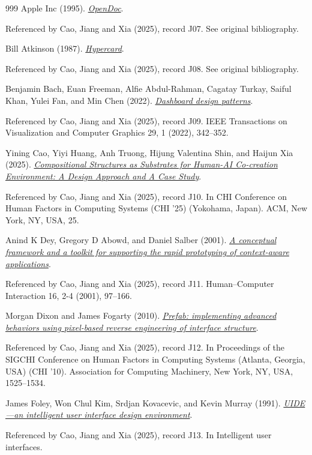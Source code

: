 \documentclass[11pt,letterpaper]{article}
\begin{document}
\begin{thebibliography}{999}
Apple Inc (1995).
\href{https://archive.org/details/OpenDocProgrammersGuide}{\emph{OpenDoc}}.
\par {\small Referenced by Cao, Jiang and Xia (2025), record J07. See original bibliography.}

Bill Atkinson (1987).
\href{https://en.wikipedia.org/wiki/HyperCard}{\emph{Hypercard}}.
\par {\small Referenced by Cao, Jiang and Xia (2025), record J08. See original bibliography.}

Benjamin Bach, Euan Freeman, Alfie Abdul-Rahman, Cagatay Turkay, Saiful Khan, Yulei Fan, and Min Chen (2022).
\href{https://arxiv.org/abs/2205.00757}{\emph{Dashboard design patterns}}.
\par {\small Referenced by Cao, Jiang and Xia (2025), record J09. IEEE Transactions on Visualization and Computer Graphics 29, 1 (2022), 342–352.}

Yining Cao, Yiyi Huang, Anh Truong, Hijung Valentina Shin, and Haijun Xia (2025).
\href{https://doi.org/10.1145/3706598.3713401}{\emph{Compositional Structures as Substrates for Human-AI Co-creation Environment: A Design Approach and A Case Study}}.
\par {\small Referenced by Cao, Jiang and Xia (2025), record J10. In CHI Conference on Human Factors in Computing Systems (CHI ’25) (Yokohama, Japan). ACM, New York, NY, USA, 25.}

Anind K Dey, Gregory D Abowd, and Daniel Salber (2001).
\href{https://doi.org/10.1207/S15327051HCI16234_02}{\emph{A conceptual framework and a toolkit for supporting the rapid prototyping of context-aware applications}}.
\par {\small Referenced by Cao, Jiang and Xia (2025), record J11. Human–Computer Interaction 16, 2-4 (2001), 97–166.}

Morgan Dixon and James Fogarty (2010).
\href{https://doi.org/10.1145/1753326.1753554}{\emph{Prefab: implementing advanced behaviors using pixel-based reverse engineering of interface structure}}.
\par {\small Referenced by Cao, Jiang and Xia (2025), record J12. In Proceedings of the SIGCHI Conference on Human Factors in Computing Systems (Atlanta, Georgia, USA) (CHI ’10). Association for Computing Machinery, New York, NY, USA, 1525–1534.}

James Foley, Won Chul Kim, Srdjan Kovacevic, and Kevin Murray (1991).
\href{https://arxiv.org/html/2503.04084v1\#bib.bib14}{\emph{UIDE—an intelligent user interface design environment}}.
\par {\small Referenced by Cao, Jiang and Xia (2025), record J13. In Intelligent user interfaces.}


\end{thebibliography}
\end{document}
